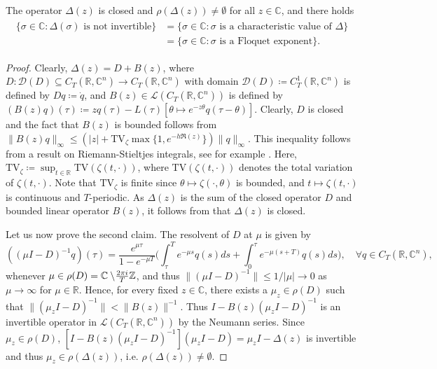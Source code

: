 \documentclass[english]{myarticle}
\begin{document}
\begin{sloppypar}
\begin{lemma} \label{lemma:Delta(z)closed}
The operator $\Delta(z)$ is closed and $\rho(\Delta(z)) \neq \emptyset$ for all $z \in \mathbb{C}$, and there holds
\begin{align} 
\begin{split} \label{eq:not inv is floquet}
    \{ \sigma \in \mathbb{C} : \Delta(\sigma) \mbox{ is not invertible} \} &= \{ \sigma \in \mathbb{C} : \sigma \mbox{ is a characteristic value of } \Delta \} \\
    & = \{\sigma \in \mathbb{C} : \sigma \mbox{ is a Floquet exponent} \}.    
\end{split}
\end{align}
\end{lemma}
\begin{proof}
Clearly, $\Delta(z) = D + B(z)$, where $D : \mathcal{D}(D) \subseteq C_T(\mathbb{R},\mathbb{C}^n) \to C_T(\mathbb{R},\mathbb{C}^n)$ with domain $\mathcal{D}(D) \coloneqq C_T^1(\mathbb{R},\mathbb{C}^n)$ is defined by $Dq \coloneqq \dot{q}$, and $B(z) \in \mathcal{L}( C_T(\mathbb{R},\mathbb{C}^n))$ is defined by $(B(z)q)(\tau) \coloneqq zq(\tau) - L(\tau)[\theta \mapsto e^{-z \theta}q(\tau-\theta)]$. Clearly, $D$ is closed and the fact that $B(z)$ is bounded follows from $\|B(z)q\|_{\infty} \leq ( |z| + \mbox{TV}_\zeta \max\{1,e^{-h \Re (z)} \}) \| q \|_{\infty}$. This inequality follows from a result on Riemann-Stieltjes integrals, see for example \cite[page 14]{Diekmann1995}. Here, $\mbox{TV}_\zeta \coloneqq \sup_{t \in \mathbb{R}} \mbox{TV}(\zeta(t,\cdot))$, where $\mbox{TV}(\zeta(t,\cdot))$ denotes the total variation of $\zeta(t,\cdot)$. Note that $\mbox{TV}_\zeta$ is finite since $\theta \mapsto \zeta(\cdot,\theta)$ is bounded, and $t \mapsto \zeta(t,\cdot)$ is continuous and $T$-periodic. As $\Delta(z)$ is the sum of the closed operator $D$ and bounded linear operator $B(z)$, it follows from \cite[Lemma 2.4]{Engel2000} that $\Delta(z)$ is closed.

Let us now prove the second claim. The resolvent of $D$ at $\mu$ is given by
\begin{equation*}
    ((\mu I - D)^{-1}q)(\tau) = \frac{e^{\mu \tau}}{1-e^{-\mu T}} \bigg( \int_\tau^T e^{-\mu s}q(s) ds + \int_0^\tau e^{-\mu (s+T)}q(s) ds\bigg), \quad \forall q \in C_T(\mathbb{R},\mathbb{C}^n),
\end{equation*}
whenever $\mu \in \rho(D) = \mathbb{C} \setminus \hspace{-2pt} \frac{2 \pi i}{T} \mathbb{Z}$, and thus $\|(\mu I - D)^{-1}\| \leq 1/|\mu| \to 0$ as $\mu \to \infty$ for $\mu \in \mathbb{R}$. Hence, for every fixed $z \in \mathbb{C}$, there exists a $\mu_z \in \rho(D)$ such that $\|(\mu_z I - D)^{-1}\| < \|B(z)\|^{-1}$. Thus $I - B(z)(\mu_z I -D)^{-1}$ is an invertible operator in $\mathcal{L}(C_T(\mathbb{R},\mathbb{C}^n))$ by the Neumann series. Since $\mu_z \in \rho(D)$, $[I - B(z)(\mu_z I -D)^{-1}](\mu_z I - D) = \mu_z I - \Delta(z)$ is invertible and thus $\mu_z \in \rho(\Delta(z))$, i.e. $\rho(\Delta(z)) \neq \emptyset$.


\end{proof}
\end{sloppypar}
\end{document}
